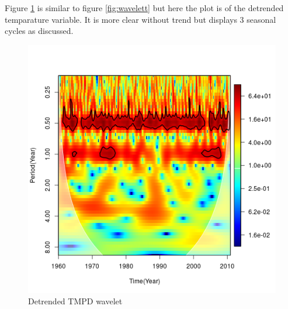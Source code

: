 \documentclass[12pt,a4paper]{article}
\begin{document}
\newpage
\noindent Figure \ref{fig:waveletdt} is similar to figure \ref{fig:wavelett} but here the plot is of the detrended temparature variable. It is more clear without trend but displays 3 seasonal cycles as discussed.
\begin{figure}
	\centering
	\includegraphics[width=0.7\linewidth]{waveletDT}
	\caption{Detrended TMPD wavelet}
	\label{fig:waveletdt}
\end{figure}
\end{document}
